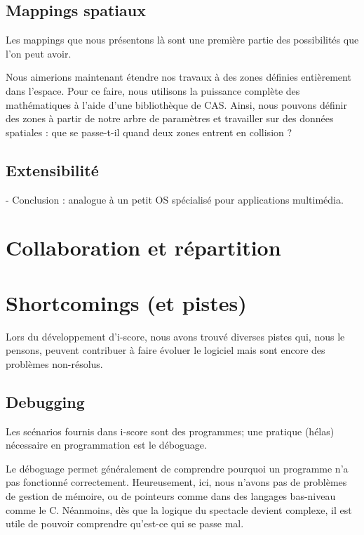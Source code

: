 \documentclass{sigchi}
\begin{document}

\subsection{Mappings spatiaux}

Les mappings que nous présentons là sont une première partie des possibilités que l'on peut avoir.

Nous aimerions maintenant étendre nos travaux à des zones définies entièrement dans l'espace. Pour ce faire, nous utilisons la puissance complète des mathématiques à l'aide d'une bibliothèque de CAS. Ainsi, nous pouvons définir des zones à partir de notre arbre de paramètres et travailler sur des données spatiales : que se passe-t-il quand deux zones entrent en collision ?
    
\subsection{Extensibilité}

- Conclusion : analogue à un petit OS spécialisé pour applications multimédia.

\section{Collaboration et répartition}

\section{Shortcomings (et pistes)}
Lors du développement d'i-score, nous avons trouvé diverses pistes qui, nous le pensons, peuvent contribuer à 
faire évoluer le logiciel mais sont encore des problèmes non-résolus.

\subsection{Debugging}
Les scénarios fournis dans i-score sont des programmes; une pratique (hélas) nécessaire en programmation est le déboguage. 

Le déboguage permet généralement de comprendre pourquoi un programme n'a pas fonctionné correctement. Heureusement, ici, nous n'avons pas de problèmes de gestion de mémoire, ou de pointeurs comme dans des langages  bas-niveau comme le C. Néanmoins, dès que la logique du spectacle devient complexe, il est utile de pouvoir comprendre qu'est-ce qui se passe mal.
\end{document}
